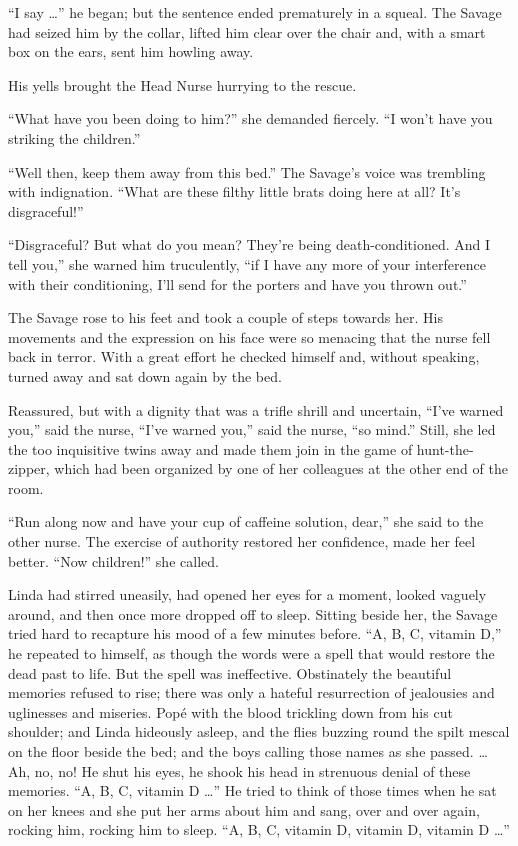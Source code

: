 \documentclass[12pt]{report}
\begin{document}
``I say \ldots{}'' he began; but the sentence ended prematurely in a
squeal. The Savage had seized him by the collar, lifted him clear over
the chair and, with a smart box on the ears, sent him howling away.

His yells brought the Head Nurse hurrying to the rescue.

``What have you been doing to him?'' she demanded fiercely. ``I won't
have you striking the children.''

``Well then, keep them away from this bed.'' The Savage's voice was
trembling with indignation. ``What are these filthy little brats doing
here at all? It's disgraceful!''

``Disgraceful? But what do you mean? They're being death-conditioned.
And I tell you,'' she warned him truculently, ``if I have any more of
your interference with their conditioning, I'll send for the porters and
have you thrown out.''

The Savage rose to his feet and took a couple of steps towards her. His
movements and the expression on his face were so menacing that the nurse
fell back in terror. With a great effort he checked himself and, without
speaking, turned away and sat down again by the bed.

Reassured, but with a dignity that was a trifle shrill and uncertain,
``I've warned you,'' said the nurse, ``I've warned you,'' said the
nurse, ``so mind.'' Still, she led the too inquisitive twins away and
made them join in the game of hunt-the-zipper, which had been organized
by one of her colleagues at the other end of the room.

``Run along now and have your cup of caffeine solution, dear,'' she said
to the other nurse. The exercise of authority restored her confidence,
made her feel better. ``Now children!'' she called.

Linda had stirred uneasily, had opened her eyes for a moment, looked
vaguely around, and then once more dropped off to sleep. Sitting beside
her, the Savage tried hard to recapture his mood of a few minutes
before. ``A, B, C, vitamin D,'' he repeated to himself, as though the
words were a spell that would restore the dead past to life. But the
spell was ineffective. Obstinately the beautiful memories refused to
rise; there was only a hateful resurrection of jealousies and uglinesses
and miseries. Popé with the blood trickling down from his cut shoulder;
and Linda hideously asleep, and the flies buzzing round the spilt mescal
on the floor beside the bed; and the boys calling those names as she
passed. \ldots{} Ah, no, no! He shut his eyes, he shook his head in
strenuous denial of these memories. ``A, B, C, vitamin D \ldots{}'' He
tried to think of those times when he sat on her knees and she put her
arms about him and sang, over and over again, rocking him, rocking him
to sleep. ``A, B, C, vitamin D, vitamin D, vitamin D \ldots{}''
\end{document}
